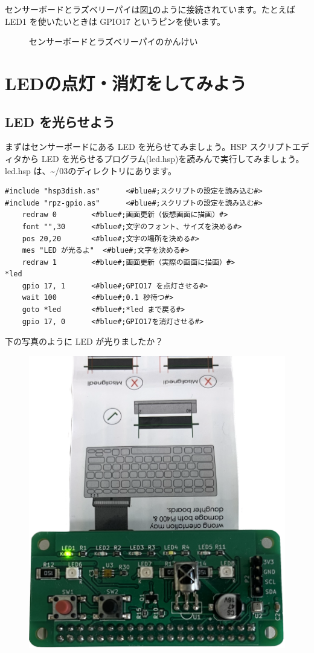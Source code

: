 センサーボードとラズベリーパイは図\ref{sensors}のように接続されています。たとえば LED1 を使いたいときは GPIO17 というピンを使います。

\begin{figure}[H]
    \centering
    
    \caption{センサーボードとラズベリーパイのかんけい}
    \label{sensors}
\end{figure}

\section{LEDの点灯・消灯をしてみよう}
\subsection{LED を光らせよう}

まずはセンサーボードにある LED を光らせてみましょう。HSP スクリプトエディタから LED を光らせるプログラム(led.hsp)を読みんで実行してみましょう。led.hsp は、\textasciitilde /03のディレクトリにあります。\\

\begin{lstlisting}[caption=\textasciitilde/03/led.hsp,label=led.hsp]
#include "hsp3dish.as"		<#blue#;スクリプトの設定を読み込む#>
#include "rpz-gpio.as"		<#blue#;スクリプトの設定を読み込む#>
	redraw 0		<#blue#;画面更新（仮想画面に描画）#>
	font "",30		<#blue#;文字のフォント、サイズを決める#>
	pos 20,20		<#blue#;文字の場所を決める#>
	mes "LED が光るよ"	<#blue#;文字を決める#>
	redraw 1		<#blue#;画面更新（実際の画面に描画）#>
*led
	gpio 17, 1		<#blue#;GPIO17 を点灯させる#>
	wait 100		<#blue#;0.1 秒待つ#>
	goto *led		<#blue#;*led まで戻る#>
	gpio 17, 0		<#blue#;GPIO17を消灯させる#>
\end{lstlisting}

下の写真のように LED が光りましたか？\\

\begin{figure}[H]
    \centering
    \includegraphics[width=0.5\linewidth]{images/chap03/led_emission_demo.png}
\end{figure}

